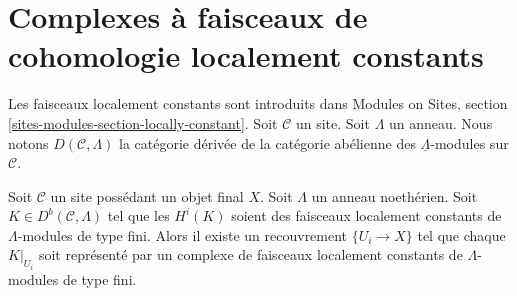 \section{Complexes à faisceaux de cohomologie localement constants}
\label{section-locally-constant}

\noindent
Les faisceaux localement constants sont introduits dans Modules on Sites,
section \ref{sites-modules-section-locally-constant}. Soit $\mathcal{C}$ un
site. Soit $\Lambda$ un anneau. Nous notons $D(\mathcal{C}, \Lambda)$ la
catégorie dérivée de la catégorie abélienne des
$\underline{\Lambda}$-modules sur $\mathcal{C}$.

\begin{lemma}
\label{lemma-locally-constant}
Soit $\mathcal{C}$ un site possédant un objet final $X$. Soit $\Lambda$ un
anneau noethérien. Soit $K \in D^b(\mathcal{C}, \Lambda)$ tel que les
$H^i(K)$ soient des faisceaux localement constants de $\Lambda$-modules de
type fini. Alors il existe un recouvrement $\{U_i \to X\}$ tel que chaque
$K|_{U_i}$ soit représenté par un complexe de faisceaux localement constants
de $\Lambda$-modules de type fini.
\end{lemma}

